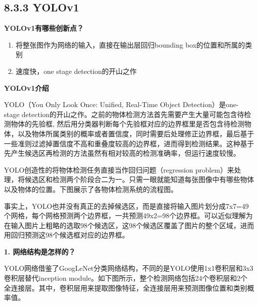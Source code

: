 \begin{figure}
\centering
\caption{}
\end{figure}

\subsection{8.3.3 YOLOv1}\label{yolov1}

\textbf{YOLOv1有哪些创新点？}

\begin{enumerate}
\def\labelenumi{\arabic{enumi}.}
\item
  将整张图作为网络的输入，直接在输出层回归bounding box的位置和所属的类别
\item
  速度快，one stage detection的开山之作
\end{enumerate}

\textbf{YOLOv1介绍}

YOLO（You Only Look Once: Unified, Real-Time Object
Detection）是one-stage
detection的开山之作。之前的物体检测方法首先需要产生大量可能包含待检测物体的先验框,
然后用分类器判断每个先验框对应的边界框里是否包含待检测物体，以及物体所属类别的概率或者置信度，同时需要后处理修正边界框，最后基于一些准则过滤掉置信度不高和重叠度较高的边界框，进而得到检测结果。这种基于先产生候选区再检测的方法虽然有相对较高的检测准确率，但运行速度较慢。

YOLO创造性的将物体检测任务直接当作回归问题（regression
problem）来处理，将候选区和检测两个阶段合二为一。只需一眼就能知道每张图像中有哪些物体以及物体的位置。下图展示了各物体检测系统的流程图。

\begin{figure}
\centering
\caption{}
\end{figure}

事实上，YOLO也并没有真正的去掉候选区，而是直接将输入图片划分成7x7=49个网格，每个网格预测两个边界框，一共预测49x2=98个边界框。可以近似理解为在输入图片上粗略的选取98个候选区，这98个候选区覆盖了图片的整个区域，进而用回归预测这98个候选框对应的边界框。

\textbf{1. 网络结构是怎样的？}

YOLO网络借鉴了GoogLeNet分类网络结构，不同的是YOLO使用1x1卷积层和3x3卷积层替代inception
module。如下图所示，整个检测网络包括24个卷积层和2个全连接层。其中，卷积层用来提取图像特征，全连接层用来预测图像位置和类别概率值。

\begin{figure}
\centering
\caption{}
\end{figure}

